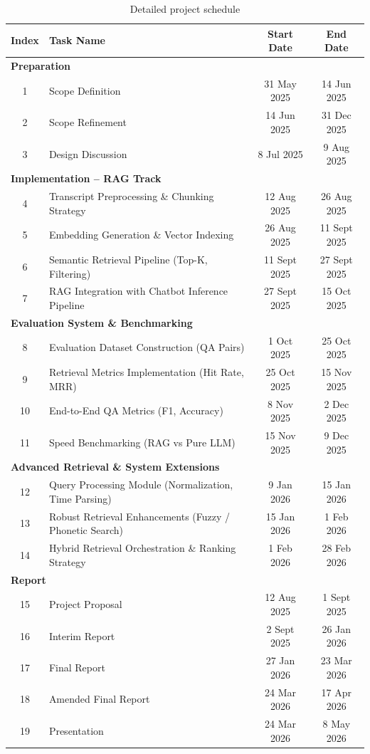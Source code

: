 \begin{table}[H]
  \centering
  \small
  \begin{tabular}{|c|>{\raggedright\arraybackslash}p{}|c|c|}
    \hline
    \textbf{Index} & \textbf{Task Name} & \textbf{Start Date} & \textbf{End Date} \\
    \hline
    \multicolumn{4}{|l|}{\textbf{Preparation}} \\
    \hline
    1 & Scope Definition & 31 May 2025 & 14 Jun 2025 \\
    2 & Scope Refinement & 14 Jun 2025 & 31 Dec 2025 \\
    3 & Design Discussion & 8 Jul 2025 & 9 Aug 2025 \\
    \hline
    \multicolumn{4}{|l|}{\textbf{Implementation -- RAG Track}} \\
    \hline
    4 & Transcript Preprocessing \& Chunking Strategy & 12 Aug 2025 & 26 Aug 2025 \\
    5 & Embedding Generation \& Vector Indexing & 26 Aug 2025 & 11 Sept 2025 \\
    6 & Semantic Retrieval Pipeline (Top-K, Filtering) & 11 Sept 2025 & 27 Sept 2025 \\
    7 & RAG Integration with Chatbot Inference Pipeline & 27 Sept 2025 & 15 Oct 2025 \\
    \hline
    \multicolumn{4}{|l|}{\textbf{Evaluation System \& Benchmarking}} \\
    \hline
    8 & Evaluation Dataset Construction (QA Pairs) & 1 Oct 2025 & 25 Oct 2025 \\
    9 & Retrieval Metrics Implementation (Hit Rate, MRR) & 25 Oct 2025 & 15 Nov 2025 \\
    10 & End-to-End QA Metrics (F1, Accuracy) & 8 Nov 2025 & 2 Dec 2025 \\
    11 & Speed Benchmarking (RAG vs Pure LLM) & 15 Nov 2025 & 9 Dec 2025 \\
    \hline
    \multicolumn{4}{|l|}{\textbf{Advanced Retrieval \& System Extensions}} \\
    \hline
    12 & Query Processing Module (Normalization, Time Parsing) & 9 Jan 2026 & 15 Jan 2026 \\
    13 & Robust Retrieval Enhancements (Fuzzy / Phonetic Search) & 15 Jan 2026 & 1 Feb 2026 \\
    14 & Hybrid Retrieval Orchestration \& Ranking Strategy & 1 Feb 2026 & 28 Feb 2026 \\
    \hline
    \multicolumn{4}{|l|}{\textbf{Report}} \\
    \hline
    15 & Project Proposal & 12 Aug 2025 & 1 Sept 2025 \\
    16 & Interim Report & 2 Sept 2025 & 26 Jan 2026 \\
    17 & Final Report & 27 Jan 2026 & 23 Mar 2026 \\
    18 & Amended Final Report & 24 Mar 2026 & 17 Apr 2026 \\
    19 & Presentation & 24 Mar 2026 & 8 May 2026 \\
    \hline
  \end{tabular}
  \caption{Detailed project schedule}
  \label{tab:project-schedule}
\end{table}
